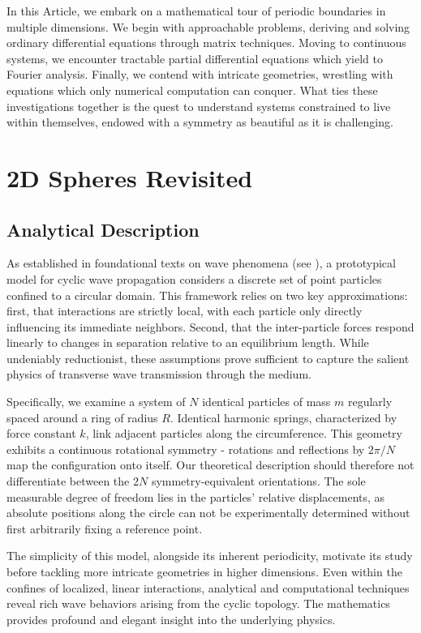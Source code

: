 \documentclass[final,5p,times,twocolumn,authoryear]{elsarticle}
\begin{document}
In this Article, we embark on a mathematical tour of periodic boundaries in multiple dimensions. We begin with approachable problems, deriving and solving ordinary differential equations through matrix techniques. Moving to continuous systems, we encounter tractable partial differential equations which yield to Fourier analysis. Finally, we contend with intricate geometries, wrestling with equations which only numerical computation can conquer. What ties these investigations together is the quest to understand systems constrained to live within themselves, endowed with a symmetry as beautiful as it is challenging.

\section{2D Spheres Revisited}
\label{sec-2D}
\subsection{Analytical Description}
As established in foundational texts on wave phenomena (see \cite{georgiPhysicsWaves2015}), a prototypical model for cyclic wave propagation considers a discrete set of point particles confined to a circular domain. This framework relies on two key approximations: first, that interactions are strictly local, with each particle only directly influencing its immediate neighbors. Second, that the inter-particle forces respond linearly to changes in separation relative to an equilibrium length. While undeniably reductionist, these assumptions prove sufficient to capture the salient physics of transverse wave transmission through the medium.

Specifically, we examine a system of $N$ identical particles of mass $m$ regularly spaced around a ring of radius $R$. Identical harmonic springs, characterized by force constant $k$, link adjacent particles along the circumference. This geometry exhibits a continuous rotational symmetry - rotations and reflections by $2\pi/N$ map the configuration onto itself. Our theoretical description should therefore not differentiate between the $2N$ symmetry-equivalent orientations. The sole measurable degree of freedom lies in the particles' relative displacements, as absolute positions along the circle can not be experimentally determined without first arbitrarily fixing a reference point.

The simplicity of this model, alongside its inherent periodicity, motivate its study before tackling more intricate geometries in higher dimensions. Even within the confines of localized, linear interactions, analytical and computational techniques reveal rich wave behaviors arising from the cyclic topology. The mathematics provides profound and elegant insight into the underlying physics.
\end{document}
